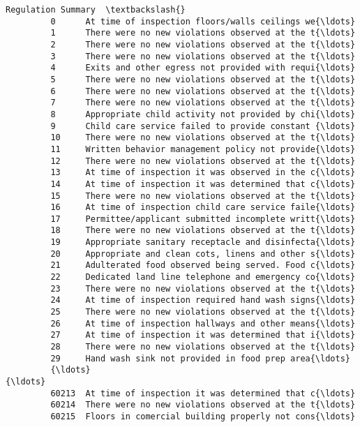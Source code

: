 \documentclass[11pt]{article}
\begin{document}
\begin{Verbatim}[commandchars=\\\{\}]
                                               Regulation Summary  \textbackslash{}
         0      At time of inspection floors/walls ceilings we{\ldots}   
         1      There were no new violations observed at the t{\ldots}   
         2      There were no new violations observed at the t{\ldots}   
         3      There were no new violations observed at the t{\ldots}   
         4      Exits and other egress not provided with requi{\ldots}   
         5      There were no new violations observed at the t{\ldots}   
         6      There were no new violations observed at the t{\ldots}   
         7      There were no new violations observed at the t{\ldots}   
         8      Appropriate child activity not provided by chi{\ldots}   
         9      Child care service failed to provide constant {\ldots}   
         10     There were no new violations observed at the t{\ldots}   
         11     Written behavior management policy not provide{\ldots}   
         12     There were no new violations observed at the t{\ldots}   
         13     At time of inspection it was observed in the c{\ldots}   
         14     At time of inspection it was determined that c{\ldots}   
         15     There were no new violations observed at the t{\ldots}   
         16     At time of inspection child care service faile{\ldots}   
         17     Permittee/applicant submitted incomplete writt{\ldots}   
         18     There were no new violations observed at the t{\ldots}   
         19     Appropriate sanitary receptacle and disinfecta{\ldots}   
         20     Appropriate and clean cots, linens and other s{\ldots}   
         21     Adulterated food observed being served. Food c{\ldots}   
         22     Dedicated land line telephone and emergency co{\ldots}   
         23     There were no new violations observed at the t{\ldots}   
         24     At time of inspection required hand wash signs{\ldots}   
         25     There were no new violations observed at the t{\ldots}   
         26     At time of inspection hallways and other means{\ldots}   
         27     At time of inspection it was determined that i{\ldots}   
         28     There were no new violations observed at the t{\ldots}   
         29     Hand wash sink not provided in food prep area{\ldots}   
         {\ldots}                                                  {\ldots}   
         60213  At time of inspection it was determined that c{\ldots}   
         60214  There were no new violations observed at the t{\ldots}   
         60215  Floors in comercial building properly not cons{\ldots}   

\end{Verbatim}
\end{document}
